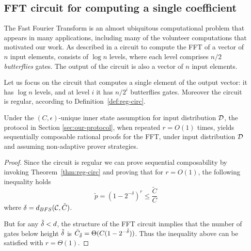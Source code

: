 
\subsection{FFT circuit for computing a single coefficient}

The Fast Fourier Transform is an almost ubiquitous computational problem that appears in many applications, including many of the volunteer 
computations that motivated our work. As described in \cite{CLRS} a circuit to compute the FFT of a vector of $n$ input elements, consists of $\log n$ levels, 
where each level comprises $n/2$ {\em butterflies} gates. The output of the circuit is also a vector of $n$ input elements. 

Let us focus on the circuit that computes a single element of the output vector: it has $\log n$ levels, and at level $i$ it has $n/2^i$ butterflies gates. 
Moreover the circuit is regular, according to Definition~\ref{def:reg-circ}.


\begin{mythm}
Under the $(C,\epsilon)$-unique inner state assumption for input distribution $\cal D$,
the protocol in Section \ref{sec:our-protocol}, when repeated $r = O(1)$ times, yields sequentially composable rational proofs for the FFT, under input 
distribution $\cal D$ and assuming non-adaptive prover strategies. 
\end{mythm}
\begin{proof}
Since the circuit is regular we can prove sequential composability by invoking Theorem~\ref{thm:reg-circ} and proving that for $r = O(1)$, 
the following inequality holds 
$$ \tilde{p} = (1-2^{-\delta})^r \leq \frac{\tilde{C}}{C} $$
where $\delta=d_{BFS}({\cal C},\tilde{C})$.

But for any $\tilde{\delta} < d$, the structure of the FFT circuit inmplies that the number of gates below height $\tilde{\delta}$ is $\tilde{C}_{\tilde{\delta}} = \Theta(C(1-2^{-\tilde{\delta}}))$.
Thus the inequality above can be satisfied with $r = \Theta(1)$.
\end{proof}	



